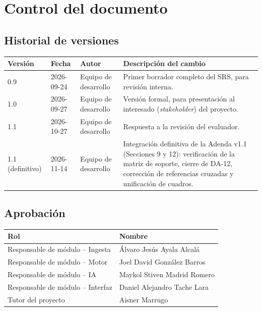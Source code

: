 \documentclass[11pt,a4paper]{report}
\begin{document}
\chapter*{Control del documento}

\section*{Historial de versiones}
\begin{table}[h]
\centering
\begin{tabularx}{\linewidth}{lllX}
\toprule
\textbf{Versi\'on} & \textbf{Fecha} & \textbf{Autor} & \textbf{Descripci\'on del cambio} \\
\midrule
0.9 & 2026-09-24 & Equipo de desarrollo & Primer borrador completo del SRS, para revisi\'on interna. \\
1.0 & 2026-09-27 & Equipo de desarrollo & Versi\'on formal, para presentaci\'on al interesado (\textit{stakeholder}) del proyecto. \\
1.1 & 2026-10-27 & Equipo de desarrollo & Respuesta a la revisi\'on del evaluador. \\
1.1 (definitivo) & 2026-11-14 & Equipo de desarrollo & Integraci\'on definitiva de la Adenda v1.1 (Secciones 9 y 12): verificaci\'on de la matriz de soporte, cierre de DA-12, correcci\'on de referencias cruzadas y unificaci\'on de cuadros. \\
\bottomrule
\end{tabularx}
\end{table}

\section*{Aprobaci\'on}
\begin{table}[h]
\centering
\begin{tabular}{ll}
\toprule
\textbf{Rol} & \textbf{Nombre} \\
\midrule
Responsable de m\'odulo -- Ingesta & \'Alvaro Jes\'us Ayala Alcal\'a  \\[0.3cm]
Responsable de m\'odulo -- Motor & Joel David Gonz\'alez Barros  \\[0.3cm]
Responsable de m\'odulo -- IA & Maykol Stiven Madrid Romero  \\[0.3cm]
Responsable de m\'odulo -- Interfaz & Daniel Alejandro Tache Lara  \\[0.3cm]
Tutor del proyecto & Aisner Marrugo  \\[0.3cm]
\bottomrule
\end{tabular}
\end{table}
\end{document}
